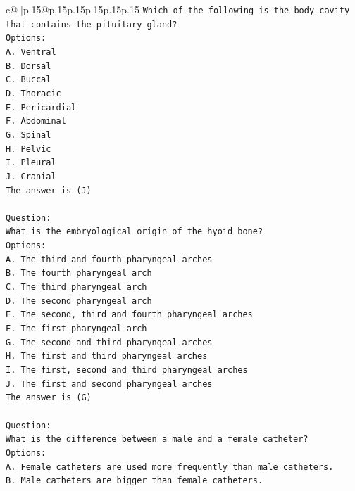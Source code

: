 \documentclass{article}
\begin{document}
{\begin{supertabular}{c@{$\;$}|p{.15\linewidth}@{}p{.15\linewidth}p{.15\linewidth}p{.15\linewidth}p{.15\linewidth}p{.15\linewidth}}
{{{\texttt{Which of the following is the body cavity that contains the pituitary gland?} \\
\texttt{Options:} \\
\texttt{A. Ventral} \\
\texttt{B. Dorsal} \\
\texttt{C. Buccal} \\
\texttt{D. Thoracic} \\
\texttt{E. Pericardial} \\
\texttt{F. Abdominal} \\
\texttt{G. Spinal} \\
\texttt{H. Pelvic} \\
\texttt{I. Pleural} \\
\texttt{J. Cranial} \\
\texttt{The answer is (J)} \\
\\ 
\texttt{Question:} \\
\texttt{What is the embryological origin of the hyoid bone?} \\
\texttt{Options:} \\
\texttt{A. The third and fourth pharyngeal arches} \\
\texttt{B. The fourth pharyngeal arch} \\
\texttt{C. The third pharyngeal arch} \\
\texttt{D. The second pharyngeal arch} \\
\texttt{E. The second, third and fourth pharyngeal arches} \\
\texttt{F. The first pharyngeal arch} \\
\texttt{G. The second and third pharyngeal arches} \\
\texttt{H. The first and third pharyngeal arches} \\
\texttt{I. The first, second and third pharyngeal arches} \\
\texttt{J. The first and second pharyngeal arches} \\
\texttt{The answer is (G)} \\
\\ 
\texttt{Question:} \\
\texttt{What is the difference between a male and a female catheter?} \\
\texttt{Options:} \\
\texttt{A. Female catheters are used more frequently than male catheters.} \\
\texttt{B. Male catheters are bigger than female catheters.} \\
}}}
\end{supertabular}}
\end{document}
